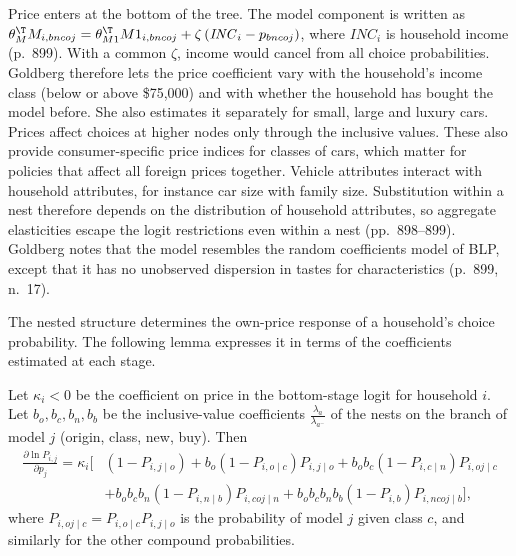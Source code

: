  Price enters at the bottom of the tree. The model component is written as
$\theta_M^{\T}M_{i,bncoj} = \theta_{M1}^{\T}M1_{i,bncoj} + \zeta\,(\mathit{INC}_i - p_{bncoj})$, where
$\mathit{INC}_i$ is household income (p.~899). With a common $\zeta$, income would cancel from all choice
probabilities. Goldberg therefore lets the price coefficient vary with the household's income class (below or
above \$75,000) and with whether the household has bought the model before. She also estimates it separately
for small, large and luxury cars. Prices affect choices at higher nodes only through the inclusive values. These
also provide consumer-specific price indices for classes of cars, which matter for policies that affect all
foreign prices together. Vehicle attributes interact with household attributes, for instance car size with
family size. Substitution within a nest therefore depends on the distribution of household attributes, so
aggregate elasticities escape the logit restrictions even within a nest (pp.~898--899). Goldberg notes that the
model resembles the random coefficients model of BLP, except that it has no unobserved dispersion in tastes for
characteristics (p.~899, n.~17).

The nested structure determines the own-price response of a household's choice probability. The following
lemma expresses it in terms of the coefficients estimated at each stage.

\begin{lemma}\label{lem:08-gold-deriv}
Let $\kappa_i < 0$ be the coefficient on price in the bottom-stage logit for household $i$. Let $b_o, b_c,
b_n, b_b$ be the inclusive-value coefficients $\frac{\lambda_a}{\lambda_{a^-}}$ of the nests on the branch of
model $j$ (origin, class, new, buy). Then
\begin{align*}
\frac{\partial \ln P_{i,j}}{\partial p_j} = \kappa_i \Big[ &(1 - P_{i,j\mid o})
+ b_o (1 - P_{i,o\mid c}) P_{i,j\mid o}
+ b_o b_c (1 - P_{i,c\mid n}) P_{i,oj\mid c} \\
&+ b_o b_c b_n (1 - P_{i,n\mid b}) P_{i,coj\mid n}
+ b_o b_c b_n b_b (1 - P_{i,b}) P_{i,ncoj\mid b} \Big],
\end{align*}
where $P_{i,oj\mid c} = P_{i,o\mid c}P_{i,j\mid o}$ is the probability of model $j$ given class $c$, and
similarly for the other compound probabilities.
\end{lemma}


